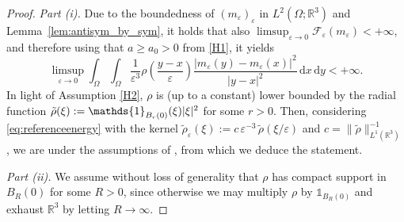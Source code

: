 \documentclass[reqno,11pt]{amsart}
\numberwithin{equation}{section}
\theoremstyle{thmlemcorr}
\numberwithin{theorem}{section}
\theoremstyle{thmlemcorr*}
\theoremstyle{defi}
\theoremstyle{remexample}
\theoremstyle{ass}
\newcommand{\R}{\mathbb{R}}
\newcommand{\Fcal}{\mathcal{F}}
\renewcommand{\epsilon}{\varepsilon}
\newcommand{\dd}{\,\mathrm{d}}
\DeclarePairedDelimiter{\abs}{\lvert}{\rvert}
\newcommand{\1}{\mathds{1}}
\newcommand{\Om}{\Omega}
\newcommand{\veps}{\varepsilon}
\begin{document}
\begin{proof}
\textit{Part (i).} Due to the boundedness of $(m_\epsilon)_\epsilon$ in $L^2(\Omega;\R^3)$ and Lemma~\ref{lem:antisym_by_sym}, it holds that also $\limsup_{\epsilon \to 0} \Fcal_\epsilon(m_\epsilon) < +\infty$, and therefore using that $a \geq a_0>0$ from \ref{H1}, it yields
    \begin{equation}\label{eq:referenceenergy}
    \limsup_{\epsilon \to 0} \int_{\Omega} \int_{\Omega}\frac{1}{\epsilon^3}\rho\left(\frac{y-x}{\epsilon}\right)\frac{|m_\epsilon(y)-m_\epsilon(x)|^2}{|y-x|^2}\dd x \dd y < +\infty.
    \end{equation}
  In light of Assumption \ref{H2}, $\rho$ is (up to a constant) lower bounded by the radial function $\tilde{\rho}(\xi):=\mathds{1}_{B_r(0)}(\xi)\abs{\xi}^2$ for some $r > 0$. Then, considering \eqref{eq:referenceenergy} with the kernel $\tilde{\rho}_\veps(\xi):=  c \, \veps^{-3} \, \tilde{\rho}(\xi/\veps)$ and $c = \|\tilde{\rho}\|^{-1}_{L^1(\R^3)}$, we are under the assumptions of \cite[Theorem~1.2]{Pon04}, from which we deduce the statement. \medskip

    \textit{Part (ii).} %
    We assume without loss of generality that $\rho$ has compact support in $B_R(0)$ for some $R > 0$, since otherwise we may multiply $\rho$ by $\mathds{1}_{B_R(0)}$ and exhaust $\R^3$ by letting $R \to \infty$. 
    

\end{proof}
\end{document}
